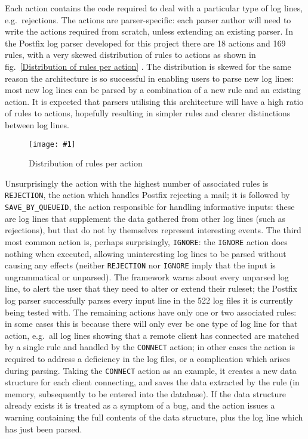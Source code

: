 \documentclass[draft]{svmult}
\newcommand{\showgraph}[3]{%
    \begin{figure}[hbtp]%
        \caption{#2}\label{#3}%
        \texttt{[image: \#1]}%
    \end{figure}%
}
\newcommand{\refwithlabel}[2]{%
    #1~\vref{#2}%
}
\newcommand{\graphref}[1]{%
    \refwithlabel{fig.}{#1}%
}
\newcommand{\numberOFrules}[0]{%
    169%
}
\newcommand{\numberOFlogFILESall}[0]{%
    522%
}
\newcommand{\numberOFactions}[0]{%
    18%
}
\begin{document}
Each action contains the code required to deal with a particular type of
log lines, e.g.\ rejections.  The actions are parser-specific: each parser
author will need to write the actions required from scratch, unless
extending an existing parser.  In the Postfix log parser developed for this
project there are \numberOFactions{} actions and \numberOFrules{} rules,
with a very skewed distribution of rules to actions as shown in
\graphref{Distribution of rules per action}.  The distribution is skewed
for the same reason the architecture is so successful in enabling users to
parse new log lines: most new log lines can be parsed by a combination of a
new rule and an existing action.  It is expected that parsers utilising
this architecture will have a high ratio of rules to actions, hopefully
resulting in simpler rules and clearer distinctions between log lines.
\showgraph{build/graph-action-distribution}{Distribution of rules per
action}{Distribution of rules per action} Unsurprisingly the action with
the highest number of associated rules is \texttt{REJECTION}, the action
which handles Postfix rejecting a mail; it is followed by
\texttt{SAVE\_BY\_QUEUEID}, the action responsible for handling informative
inputs: these are log lines that supplement the data gathered from other
log lines (such as rejections), but that do not by themselves represent
interesting events.  The third most common action is, perhaps surprisingly,
\texttt{IGNORE}: the \texttt{IGNORE} action does nothing when executed,
allowing uninteresting log lines to be parsed without causing any effects
(neither \texttt{REJECTION} nor \texttt{IGNORE} imply that the input is
ungrammatical or unparsed).  The framework warns about every unparsed log
line, to alert the user that they need to alter or extend their ruleset;
the Postfix log parser successfully parses every input line in the
\numberOFlogFILESall{} log files it is currently being tested with.  The
remaining actions have only one or two associated rules: in some cases this
is because there will only ever be one type of log line for that action,
e.g.\ all log lines showing that a remote client has connected are matched
by a single rule and handled by the \texttt{CONNECT} action; in other cases
the action is required to address a deficiency in the log files, or a
complication which arises during parsing.  Taking the \texttt{CONNECT}
action as an example, it creates a new data structure for each client
connecting, and saves the data extracted by the rule (in memory,
subsequently to be entered into the database).  If the data structure
already exists it is treated as a symptom of a bug, and the action issues a
warning containing the full contents of the data structure, plus the log
line which has just been parsed.
\end{document}
